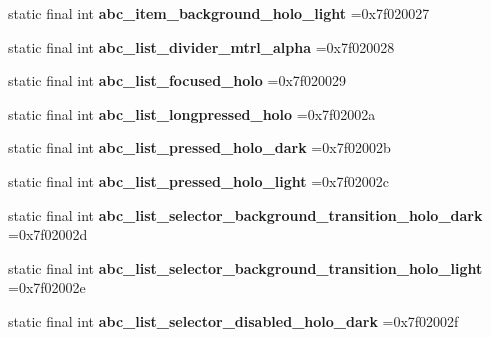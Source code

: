 \begin{DoxyCompactItemize}
static final int {\bfseries abc\+\_\+item\+\_\+background\+\_\+holo\+\_\+light} =0x7f020027
\item 
\mbox{\label{classproject4_1_1xaria_1_1R_1_1drawable_a18f858c4012a8d48b176eff27fdd3427}} 
static final int {\bfseries abc\+\_\+list\+\_\+divider\+\_\+mtrl\+\_\+alpha} =0x7f020028
\item 
\mbox{\label{classproject4_1_1xaria_1_1R_1_1drawable_af4c719b01d4e50d83ccea29ec814791c}} 
static final int {\bfseries abc\+\_\+list\+\_\+focused\+\_\+holo} =0x7f020029
\item 
\mbox{\label{classproject4_1_1xaria_1_1R_1_1drawable_a6b1c898fd7b0c9cb350abebe88052ffa}} 
static final int {\bfseries abc\+\_\+list\+\_\+longpressed\+\_\+holo} =0x7f02002a
\item 
\mbox{\label{classproject4_1_1xaria_1_1R_1_1drawable_ab62dd9369272dbe87672df6457e26ad6}} 
static final int {\bfseries abc\+\_\+list\+\_\+pressed\+\_\+holo\+\_\+dark} =0x7f02002b
\item 
\mbox{\label{classproject4_1_1xaria_1_1R_1_1drawable_af288d53efbf65afaf799788e0c0cac24}} 
static final int {\bfseries abc\+\_\+list\+\_\+pressed\+\_\+holo\+\_\+light} =0x7f02002c
\item 
\mbox{\label{classproject4_1_1xaria_1_1R_1_1drawable_aa01ac60e02df1815049c0e118acb11ff}} 
static final int {\bfseries abc\+\_\+list\+\_\+selector\+\_\+background\+\_\+transition\+\_\+holo\+\_\+dark} =0x7f02002d
\item 
\mbox{\label{classproject4_1_1xaria_1_1R_1_1drawable_a13f3e22fcfeb32911a0212ac2b36da41}} 
static final int {\bfseries abc\+\_\+list\+\_\+selector\+\_\+background\+\_\+transition\+\_\+holo\+\_\+light} =0x7f02002e
\item 
\mbox{\label{classproject4_1_1xaria_1_1R_1_1drawable_a394cb13f8476732a683b237667a5cc20}} 
static final int {\bfseries abc\+\_\+list\+\_\+selector\+\_\+disabled\+\_\+holo\+\_\+dark} =0x7f02002f

\end{DoxyCompactItemize}
